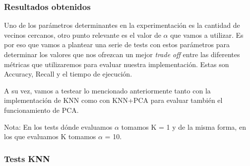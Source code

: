 

\subsubsection*{Resultados obtenidos}

Uno de los parámetros determinantes en la experimentación es la cantidad de vecinos cercanos, otro punto relevante es el valor de $\alpha$ que vamos a utilizar. Es por eso que vamos a plantear una serie de tests con estos parámetros para determinar los valores que nos ofrezcan un mejor \textit{trade off} entre las diferentes métricas que utilizaremos para evaluar nuestra implementación.\newline
Estas son Accuracy, Recall y el tiempo de ejecución.

A su vez, vamos a testear lo mencionado anteriormente tanto con la implementación de KNN como con KNN+PCA para evaluar también el funcionamiento de PCA. 

Nota: En los tests dónde evaluamos $\alpha$ tomamos K = 1 y de la misma forma, en los que evaluamos K tomamos $\alpha$ = 10. 
\subsubsection*{Tests KNN}

